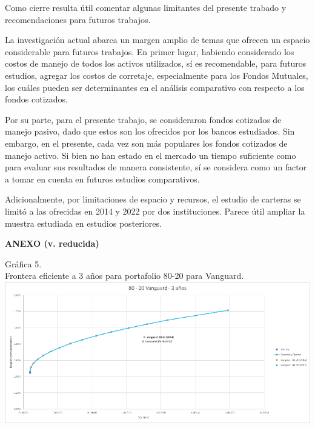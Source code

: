 \documentclass[a4paper,fleqn]{cas-sc}
\begin{document}
Como cierre resulta útil comentar algunas limitantes del presente trabado y recomendaciones para futuros trabajos. 

La investigación actual abarca un margen amplio de temas que ofrecen un espacio considerable para futuros trabajos. En primer lugar, habiendo considerado los costos de manejo de todos los activos utilizados, sí es recomendable, para futuros estudios, agregar los costos de corretaje, especialmente para los Fondos Mutuales, los cuáles pueden ser determinantes en el análisis comparativo con respecto a los fondos cotizados. 

Por su parte, para el presente trabajo, se consideraron fondos cotizados de manejo pasivo, dado que estos son los ofrecidos por los bancos estudiados. Sin embargo, en el presente, cada vez son más populares los fondos cotizados de manejo activo. Si bien no han estado en el mercado un tiempo suficiente como para evaluar sus resultados de manera consistente, sí se considera como un factor a tomar en cuenta en futuros estudios comparativos. 

Adicionalmente, por limitaciones de espacio y recursos, el estudio de carteras se limitó a las ofrecidas en 2014 y 2022 por dos instituciones. Parece útil ampliar la muestra estudiada en estudios posteriores.

\newpage

\begin{center}
    \textbf{ANEXO (v. reducida)}
\end{center}

\begin{center}
    Gráfica 5.\\
    Frontera eficiente a 3 años para portafolio 80-20 para Vanguard.\\

    \includegraphics[scale=1.5]{image/imagen5.png}

\end{center}
\end{document}

